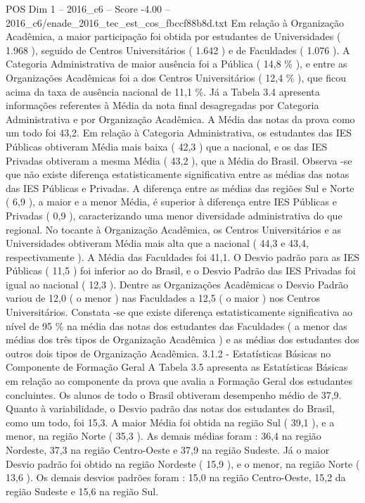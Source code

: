 \begin{textsample}{POS Dim 1 – 2016\_c6 – Score -4.00 – 2016\_c6/enade\_2016\_tec\_est\_cos\_fbccf88b8d.txt}
Em relação à Organização Acadêmica, a maior participação foi obtida por estudantes de Universidades ( 1.968 ), seguido de Centros Universitários ( 1.642 ) e de Faculdades ( 1.076 ).
A Categoria Administrativa de maior ausência foi a Pública ( 14,8 \% ), e entre as Organizações Acadêmicas foi a dos Centros Universitários ( 12,4 \% ), que ficou acima da taxa de ausência nacional de 11,1 \%.
Já a Tabela 3.4 apresenta informações referentes à Média da nota final desagregadas por Categoria Administrativa e por Organização Acadêmica.
A Média das notas da prova como um todo foi 43,2.
Em relação à Categoria Administrativa, os estudantes das IES Públicas obtiveram Média mais baixa ( 42,3 ) que a nacional, e os das IES Privadas obtiveram a mesma Média ( 43,2 ), que a Média do Brasil.
Observa -se que não existe diferença estatisticamente significativa entre as médias das notas das IES Públicas e Privadas.
A diferença entre as médias das regiões Sul e Norte ( 6,9 ), a maior e a menor Média, é superior à diferença entre IES Públicas e Privadas ( 0,9 ), caracterizando uma menor diversidade administrativa do que regional.
No tocante à Organização Acadêmica, os Centros Universitários e as Universidades obtiveram Média mais alta que a nacional ( 44,3 e 43,4, respectivamente ).
A Média das Faculdades foi 41,1.
O Desvio padrão para as IES Públicas ( 11,5 ) foi inferior ao do Brasil, e o Desvio Padrão das IES Privadas foi igual ao nacional ( 12,3 ).
Dentre as Organizações Acadêmicas o Desvio Padrão variou de 12,0 ( o menor ) nas Faculdades a 12,5 ( o maior ) nos Centros Universitários.
Constata -se que existe diferença estatisticamente significativa ao nível de 95 \% na média das notas dos estudantes das Faculdades ( a menor das médias dos três tipos de Organização Acadêmica ) e as médias dos estudantes dos outros dois tipos de Organização Acadêmica. 3.1.2 - Estatísticas Básicas no Componente de Formação Geral A Tabela 3.5 apresenta as Estatísticas Básicas em relação ao componente da prova que avalia a Formação Geral dos estudantes concluintes.
Os alunos de todo o Brasil obtiveram desempenho médio de 37,9.
Quanto à variabilidade, o Desvio padrão das notas dos estudantes do Brasil, como um todo, foi 15,3.
A maior Média foi obtida na região Sul ( 39,1 ), e a menor, na região Norte ( 35,3 ).
As demais médias foram : 36,4 na região Nordeste, 37,3 na região Centro-Oeste e 37,9 na região Sudeste.
Já o maior Desvio padrão foi obtido na região Nordeste ( 15,9 ), e o menor, na região Norte ( 13,6 ).
Os demais desvios padrões foram : 15,0 na região Centro-Oeste, 15,2 da região Sudeste e 15,6 na região Sul.

\end{textsample}
